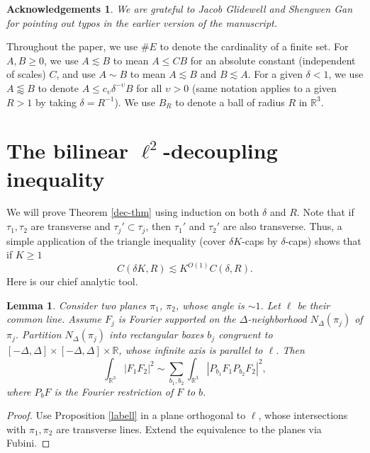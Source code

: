 \documentclass{amsart}%
\numberwithin{equation}{section}
\newtheorem*{acknowledgement}{Acknowledgements}
\newtheorem{lemma}[theorem]{Lemma}
\newcommand{\de}{\delta}
\newcommand{\ZR}{\mathbb{R}}
\newcommand{\R}{\mathbb{R}}
\newcommand{\1}{\mathbbm{1}}
\begin{document}
\bigskip 

\begin{acknowledgement}
\rm
		We are grateful to Jacob Glidewell and Shengwen Gan for pointing out typos in the earlier version of the manuscript.
	\end{acknowledgement}
    
\bigskip

Throughout the paper, we use $\# E$ to denote the cardinality of a finite set.
For $A,B\geq 0$, we use $A\lesssim B$ to mean $A\leq CB$ for an absolute constant (independent of scales) $C$, and use $A\sim B$ to mean $A\lesssim B$ and $B\lesssim A$.
For a given $\de<1$, we use $ A \lessapprox B$ to denote $A\leq c_{\upsilon}\de^{-\upsilon} B$ for all $\upsilon>0$ (same notation applies to a given $R>1$ by taking $\de=R^{-1}$). 
We use $B_R$ to denote a ball of radius $R$ in $\ZR^3$.






\bigskip
	
	
\section{The bilinear \texorpdfstring{$\ell^2$}{}-decoupling inequality}

	We will prove Theorem \ref{dec-thm} using induction on both $\delta$ and $R$.
	Note that if $\tau_1,\tau_2$ are transverse and $\tau_j'\subset \tau_{j}$, then $\tau_1'$ and $\tau_2'$ are also transverse. 
    Thus, a simple application of the triangle inequality (cover $\delta K$-caps by $\delta$-caps) shows that if $K\ge 1$
	\begin{equation}
		\label{hguugyrtugyuy5yty}
		C(\delta K,R)\lesssim K^{O(1)}C(\delta,R).
	\end{equation}    
    Here is our chief analytic tool.
	\begin{lemma}
		\label{main-tool}
		Consider two planes $\pi_1$, $\pi_2$, whose angle is $\sim 1$. Let $\ell$ be their common line. Assume $F_j$ is Fourier supported on the $\Delta$-neighborhood $N_\Delta(\pi_j)$ of $\pi_j$. Partition $N_\Delta(\pi_j)$ into rectangular boxes $b_j$ congruent to $[-\Delta,\Delta]\times [-\Delta,\Delta]\times \R$, whose infinite axis is parallel to $\ell$. 
	Then 
		$$\int_{\R^3}|F_1F_2|^2\sim \sum_{b_1,b_2}\int_{\R^3}|P_{b_1}F_1P_{b_2}F_2|^2,$$
		where $P_b F$ is the Fourier restriction of $F$ to $b$.
	\end{lemma}
	\begin{proof}
		Use Proposition \ref{labell} in a plane orthogonal to $\ell$, whose intersections with $\pi_1,\pi_2$ are transverse lines. Extend the equivalence to the planes via Fubini. \qedhere
		
	\end{proof}
	
\end{document}
